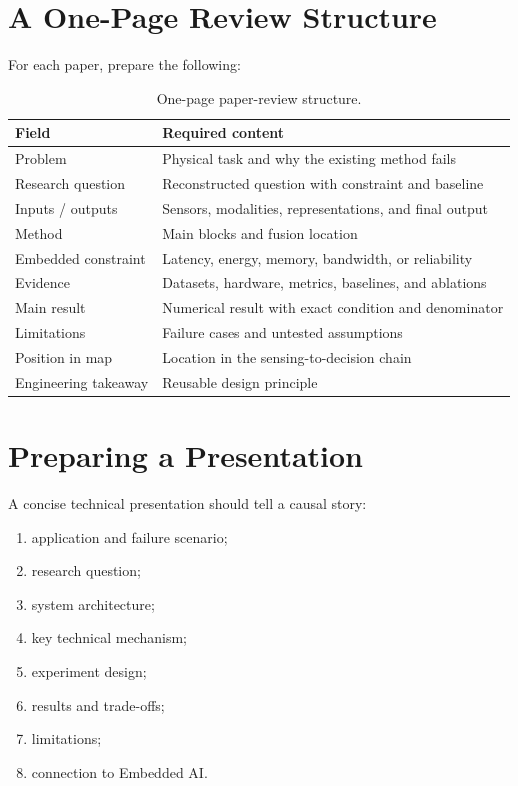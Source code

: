 \section{A One-Page Review Structure}

For each paper, prepare the following:

\begin{table}[H]
\centering
\caption{One-page paper-review structure.}
\label{tab:one-page-review}
\begin{tabularx}{\textwidth}{@{}p{3.0cm}X@{}}
\toprule
\textbf{Field} & \textbf{Required content} \\
\midrule
Problem & Physical task and why the existing method fails \\
Research question & Reconstructed question with constraint and baseline \\
Inputs / outputs & Sensors, modalities, representations, and final output \\
Method & Main blocks and fusion location \\
Embedded constraint & Latency, energy, memory, bandwidth, or reliability \\
Evidence & Datasets, hardware, metrics, baselines, and ablations \\
Main result & Numerical result with exact condition and denominator \\
Limitations & Failure cases and untested assumptions \\
Position in map & Location in the sensing-to-decision chain \\
Engineering takeaway & Reusable design principle \\
\bottomrule
\end{tabularx}
\end{table}

\section{Preparing a Presentation}

A concise technical presentation should tell a causal story:

\begin{enumerate}[label=\arabic*.]
    \item application and failure scenario;
    \item research question;
    \item system architecture;
    \item key technical mechanism;
    \item experiment design;
    \item results and trade-offs;
    \item limitations;
    \item connection to Embedded AI.
\end{enumerate}

